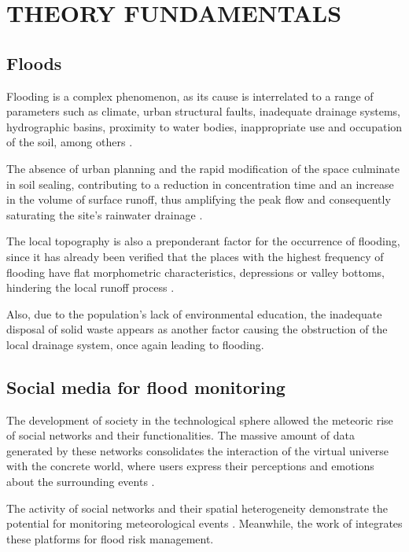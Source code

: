 \chapter{THEORY FUNDAMENTALS}\label{Rev}


\section{Floods}\label{flood}

Flooding is a complex phenomenon, as its cause is interrelated to a range of parameters such as climate, urban structural faults, inadequate drainage systems, hydrographic basins, proximity to water bodies, inappropriate use and occupation of the soil, among others \cite{doocy2013human}.

The absence of urban planning and the rapid modification of the space culminate in soil sealing, contributing to a reduction in concentration time and an increase in the volume of surface runoff, thus amplifying the peak flow and consequently saturating the site's rainwater drainage \cite{hansmann2013descriccao}.

The local topography is also a preponderant factor for the occurrence of flooding, since it has already been verified that the places with the highest frequency of flooding have flat morphometric characteristics, depressions or valley bottoms, hindering the local runoff process \cite{braga2016alagamentos}.

Also, due to the population's lack of environmental education, the inadequate disposal of solid waste appears as another factor causing the obstruction of the local drainage system, once again leading to flooding.

\section{Social media for flood monitoring}\label{social}

The development of society in the technological sphere allowed the meteoric rise of social networks and their functionalities.
The massive amount of data generated by these networks consolidates the interaction of the virtual universe with the concrete world, where users express their perceptions and emotions about the surrounding events \cite{naaman2011geographic}. 

The activity of social networks and their spatial heterogeneity demonstrate the potential for monitoring meteorological events \cite{de2021effect}. Meanwhile, the work of  integrates these platforms for flood risk management.

